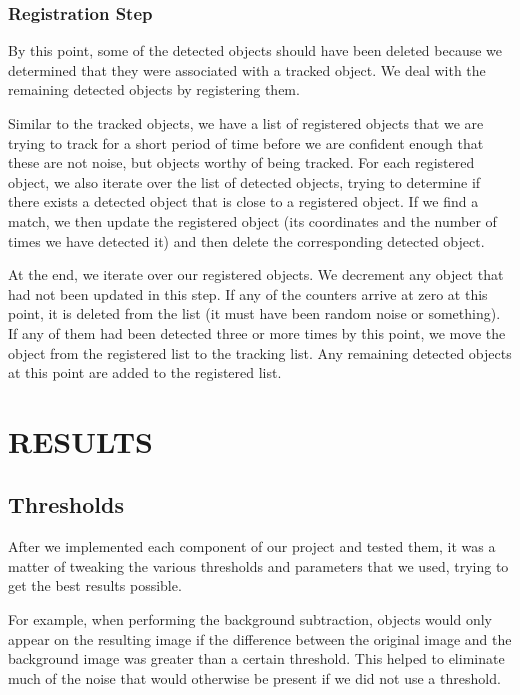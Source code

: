 \documentclass[a4paper, 10pt, conference]{ieeeconf}      %
\begin{document}
\subsubsection{Registration Step}

By this point, some of the detected objects should have been deleted because we determined that they were associated with a tracked object. We deal with the remaining detected objects by registering them. \newline

Similar to the tracked objects, we have a list of registered objects that we are trying to track for a short period of time before we are confident enough that these are not noise, but objects worthy of being tracked. For each registered object, we also iterate over the list of detected objects, trying to determine if there exists a detected object that is close to a registered object. If we find a match, we then update the registered object (its coordinates and the number of times we have detected it) and then delete the corresponding detected object. \newline

At the end, we iterate over our registered objects. We decrement any object that had not been updated in this step. If any of the counters arrive at zero at this point, it is deleted from the list (it must have been random noise or something). If any of them had been detected three or more times by this point, we move the object from the registered list to the tracking list. Any remaining detected objects at this point are added to the registered list. \newline

\section{RESULTS}

\subsection{Thresholds}
After we implemented each component of our project and tested them, it was a matter of tweaking the various thresholds and parameters that we used, trying to get the best results possible. \newline

For example, when performing the background subtraction, objects would only appear on the resulting image if the difference between the original image and the background image was greater than a certain threshold. This helped to eliminate much of the noise that would otherwise be present if we did not use a threshold. \newline
\end{document}

